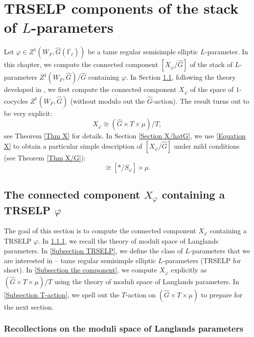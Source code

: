 


\chapter{TRSELP components of the stack of $L$-parameters} \label{Chapter MoLP}

    Let $\varphi \in Z^1(W_F, \hat{G}(\overline{\mathbb{F}_{\ell}}))$ be a tame regular semisimple elliptic $L$-parameter. In this chapter, we compute the connected component $[X_{\varphi}/\hat{G}]$ of the stack of $L$-parameters $Z^1(W_F, \hat{G})/\hat{G}$ containing $\varphi$. In Section \ref{Section X_phi}, following the theory developed in \cite[Section 3, 4]{dat2022ihes}, we first compute the connected component $X_{\varphi}$ of the space of $1$-cocycles $Z^1(W_F, \hat{G})$ (without modulo out the $\hat{G}$-action).
    The result turns out to be very explicit:
    \begin{equation}\label{Equation X}
    	X_{\varphi} \cong (\hat{G} \times T \times \mu)/T,
    \end{equation}
    see Theorem \ref{Thm X} for details. In Section \ref{Section X/hatG}, we use \eqref{Equation X} to obtain a particular simple description of $[X_{\varphi}/\hat{G}]$ under mild conditions (see Theorem \ref{Thm X/G}):
    \begin{equation}
    	[X_{\varphi}/\hat{G}] \cong [*/S_{\varphi}] \times \mu.
    \end{equation}
    
	\section{The connected component $X_{\varphi}$ containing a TRSELP $\varphi$}\label{Section X_phi}
	
	The goal of this section is to compute the connected component $X_{\varphi}$ containing a TRSELP $\varphi$. In \ref{Subsection MoLP}, we recall the theory of moduli space of Langlands parameters. In \ref{Subsection TRSELP}, we define the class of $L$-parameters that we are interested in -- tame regular semisimple elliptic $L$-parameters (TRSELP for short). In \ref{Subsection the component}, we compute $X_{\varphi}$ explicitly as $(\hat{G}\times T\times \mu)/T$ using the theory of moduli space of Langlands parameters. In \ref{Subsection T-action}, we spell out the $T$-action on $(\hat{G}\times T\times \mu)$ to prepare for the next section.
	
	\subsection{Recollections on the moduli space of Langlands parameters}\label{Subsection MoLP}
	
